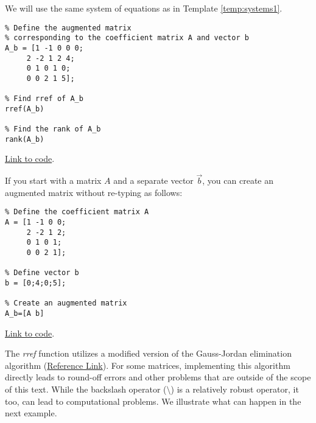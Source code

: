 \documentclass{ximera}
\begin{document}
\begin{template}\label{temp:rref}
We will use the same system of equations as in Template \ref{temp:systems1}.
    \begin{verbatim}
% Define the augmented matrix 
% corresponding to the coefficient matrix A and vector b
A_b = [1 -1 0 0 0;
     2 -2 1 2 4;
     0 1 0 1 0;
     0 0 2 1 5];
     
% Find rref of A_b
rref(A_b)

% Find the rank of A_b
rank(A_b)
    \end{verbatim}

\href{https://sagecell.sagemath.org/?z=eJxFjsEKwjAMhu-FvsN_Gehh0A49iYfB8CVEpOvSWWSt1Co-vumkmBCS_-cjSYOBnA-EfCOY17xQyDRhMTn5D2xMiZ6PGCYfZuS4UjaSc956JivXw4QJb7I5JoxS9NcRR5w1Wg1V8iAFSnRoO2huu-oo6F_9DYXC7C_VkaLByfMBfsYhOvB6KYrY8LSVgoUJ91V8ASwdNw8=&lang=octave&interacts=eJyLjgUAARUAuQ==}{Link to code}.    

\begin{remark}
    If you start with a matrix $A$ and a separate vector $\vec{b}$, you can create an augmented matrix without re-typing as follows:
    \begin{verbatim}
% Define the coefficient matrix A
A = [1 -1 0 0;
     2 -2 1 2;
     0 1 0 1;
     0 0 2 1];

% Define vector b
b = [0;4;0;5];

% Create an augmented matrix
A_b=[A b]
    \end{verbatim}

\href{https://sagecell.sagemath.org/?z=eJxFjrEKAyEQRHvBf5jmyoNVkkqukOQvjiOoWROL80BMyOdHIZLtHjvMvAlXjikz6pMRDo4xhcS5Yne1pA-sFBYLVoVZgUBGCvTTmDUU9GBCf6s_UouorbEU09h4c6hHgZfC904yJ0PmPEKXwq4yXIZ7PfbmwPefRXO4-WW18NsXtMsrmQ==&lang=octave&interacts=eJyLjgUAARUAuQ==}{Link to code}.
    
\end{remark}
\end{template}

\begin{warning}
    The \emph{rref} function utilizes a modified version of the Gauss-Jordan elimination algorithm (\href{https://www.mathworks.com/help/matlab/ref/rref.html}{Reference Link}).  For some matrices, implementing this algorithm directly leads to round-off errors and other problems that are outside of the scope of this text.  While the backslash operator ($\setminus$) is a relatively robust operator, it too, can lead to computational problems.  We illustrate what can happen in the next example.   
\end{warning}
\end{document}

